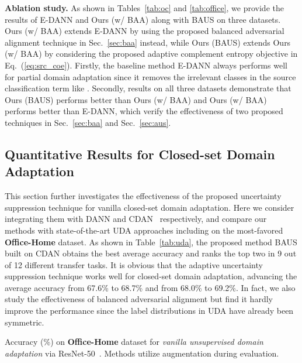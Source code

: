 \documentclass[runningheads]{llncs}
\begin{document}
\textbf{Ablation study.}
As shown in Tables~\ref{tab:oc} and \ref{tab:office}, we provide the results of E-DANN and Ours (w/ BAA) along with BAUS on three datasets.
Ours (w/ BAA) extends E-DANN by using the proposed balanced adversarial alignment technique in Sec.~\ref{sec:baa} instead, while Ours (BAUS) extends Ours (w/ BAA) by considering the proposed adaptive complement entropy objective in Eq.~(\ref{eq:src_coe}).
Firstly, the baseline method E-DANN always performs well for partial domain adaptation since it removes the irrelevant classes in the source classification term like \cite{cao2018partial}.
Secondly, results on all three datasets demonstrate that Ours (BAUS) performs better than Ours (w/ BAA) and Ours (w/ BAA) performs better than E-DANN, which verify the effectiveness of two proposed techniques in Sec.~\ref{sec:baa} and Sec.~\ref{sec:aus}.
	
\subsection{Quantitative Results for Closed-set Domain Adaptation} 
This section further investigates the effectiveness of the proposed uncertainty suppression technique for vanilla closed-set domain adaptation.
Here we consider integrating them with DANN and CDAN~\cite{long2018conditional} respectively, and compare our methods with state-of-the-art UDA approaches including \cite{wang2019transferable,xu2019unsupervised} on the most-favored \textbf{Office-Home} dataset.
As shown in Table~\ref{tab:uda}, the proposed method BAUS built on CDAN obtains the best average accuracy and ranks the top two in 9 out of 12 different transfer tasks.
It is obvious that the adaptive uncertainty suppression technique works well for closed-set domain adaptation, advancing the average accuracy from 67.6\% to 68.7\% and from 68.0\% to 69.2\%.
In fact, we also study the effectiveness of balanced adversarial alignment but find it hardly improve the performance since the label distributions in UDA have already been symmetric.
	
	\setlength{\tabcolsep}{1.0pt}
	\begin{table*}[htbp]
		\centering
		\small
		\caption{Accuracy (\%) on \textbf{Office-Home} dataset for \emph{vanilla unsupervised domain adaptation} via ResNet-50~\cite{he2016deep}. Methods utilize augmentation during evaluation.}
		\label{tab:uda}\end{table*}
\end{document}
